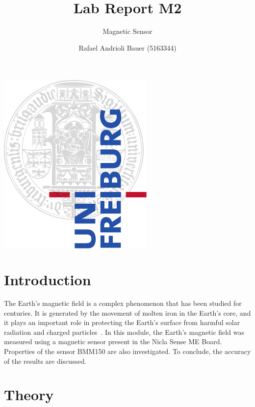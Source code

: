 \documentclass[DIV=14]{scrartcl}
\title{Lab Report M2}
\subtitle{Magnetic Sensor}
\author{Rafael Andrioli Bauer (5163344)}
\begin{document}
    \maketitle

    \thispagestyle{empty}

    \vfill
    \begin{center}
        \includegraphics{ufcd-logo-e1-a4-color.pdf} \vspace{1cm} \\
    \end{center}
    \vfill

    \clearpage


    \section{Introduction}

    The Earth's magnetic field is a complex phenomenon that has been studied for centuries.
    It is generated by the movement of molten iron in the Earth's core, and it plays an important role in
    protecting the Earth's surface from harmful solar radiation and charged particles~\cite{labManual}.
    In this module, the Earth's magnetic field was measured using a magnetic sensor present
    in the Nicla Sense ME Board.
    Properties of the sensor BMM150 are also investigated.
    To conclude, the accuracy of the results are discussed.



    \section{Theory}\label{sec:theory}
\end{document}

